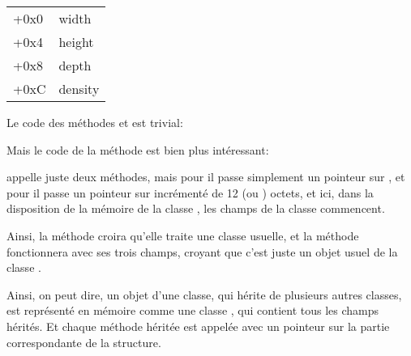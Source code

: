 \begin{center}
\begin{tabular}{ | l | l | }
\hline
  \tableheader{} \\
\hline
  +0x0 & width \\
\hline
  +0x4 & height \\
\hline
  +0x8 & depth \\
\hline
  +0xC & density \\
\hline
\end{tabular}
\end{center}


Le code des méthodes  et  est trivial:






Mais le code de la méthode  est bien plus intéressant:




 appelle juste deux méthodes, mais pour  il passe
simplement un pointeur sur , et pour  il passe un pointeur
sur  incrémenté de 12 (ou ) octets, et ici, dans la disposition
de la mémoire de la classe , les champs de la classe 
commencent.


Ainsi, la méthode  croira qu'elle traite une classe
 usuelle, et la méthode  fonctionnera avec
ses trois champs, croyant que c'est juste un objet usuel de la classe .


Ainsi, on peut dire, un objet d'une classe, qui hérite de plusieurs autres classes,
est représenté en mémoire comme une classe , qui contient tous les champs
hérités.
Et chaque méthode héritée est appelée avec un pointeur sur la partie correspondante
de la structure.

